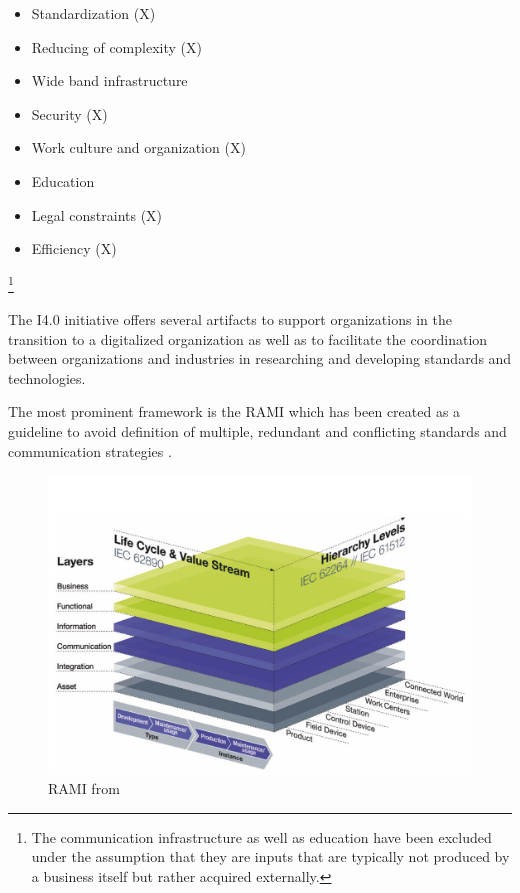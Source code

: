 \begin{itemize}
	\item  Standardization (X)
	\item  Reducing of complexity (X)
	\item  Wide band infrastructure
	\item  Security (X)
	\item  Work culture and organization (X)
	\item  Education
	\item  Legal constraints (X)
	\item  Efficiency (X)
\end{itemize}
\footnote{The communication infrastructure as well as education have been excluded under the assumption that they are inputs that are typically not produced by a business itself but rather acquired externally.}

The I4.0 initiative offers several artifacts to support organizations in the transition to a digitalized organization as well as to facilitate the coordination between organizations and industries in researching and developing standards and technologies. 

The most prominent framework is the \ac{RAMI} which has been created as a guideline to avoid definition of multiple, redundant and conflicting standards and communication strategies \cite[p. 41]{umsetzungsstrategie:2015}.

\begin{figure}
\centering
\includegraphics[width=1\columnwidth]{images/RAMI}
\caption{\ac{RAMI} from \citeauthor{umsetzungsstrategie:2015}}
\end{figure}

